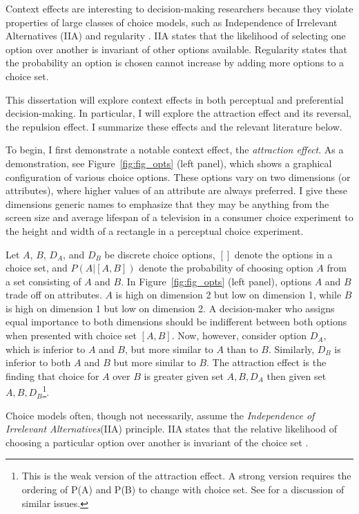 Context effects are interesting to decision-making researchers because they violate properties of large classes of choice models, such as Independence of Irrelevant Alternatives (IIA) \parencite{ray1973independence} and regularity \parencite{mackay1995probabilistic,marley1989random}. IIA states that the likelihood of selecting one option over another is invariant of other options available. Regularity states that the probability an option is chosen cannot increase by adding more options to a choice set.

This dissertation will explore context effects in both perceptual and preferential decision-making. In particular, I will explore the attraction effect and its reversal, the repulsion effect. I summarize these effects and the relevant literature below.

To begin, I first demonstrate a notable context effect, the \textit{attraction effect}. As a demonstration, see Figure~\ref{fig:fig_opts} (left panel), which shows a graphical configuration of various choice options. These options vary on two dimensions (or attributes), where higher values of an attribute are always preferred. I give these dimensions generic names to emphasize that they may be anything from the screen size and average lifespan of a television in a consumer choice experiment to the height and width of a rectangle in a perceptual choice experiment.

Let $A$, $B$, $D_{A}$, and $D_{B}$ be discrete choice options, $[]$ denote the options in a choice set, and $P(A|[A,B])$ denote the probability of choosing option $A$ from a set consisting of $A$ and $B$. In Figure~\ref{fig:fig_opts} (left panel), options $A$ and $B$ trade off on attributes. $A$ is high on dimension 2 but low on dimension 1, while $B$ is high on dimension 1 but low on dimension 2. A decision-maker who assigns equal importance to both dimensions should be indifferent between both options when presented with choice set $[A,B]$. Now, however, consider option $D_{A}$, which is inferior to $A$ and $B$, but more similar to $A$ than to $B$. Similarly, $D_{B}$ is inferior to both $A$ and $B$ but more similar to $B$. The attraction effect is the finding that choice for $A$ over $B$ is greater given set ${A,B,D_{A}}$ then given set $A,B,D_{B}$\footnote{This is the weak version of the attraction effect. A strong version requires the ordering of P(A) and P(B) to change with choice set. See \textcite{davis2023illustrated} for a discussion of similar issues.}. 

Choice models often, though not necessarily, assume the \textit{Independence of Irrelevant Alternatives}(IIA) principle. IIA states that the relative likelihood of choosing a particular option over another is invariant of the choice set \parencite{ray1973independence}. 

